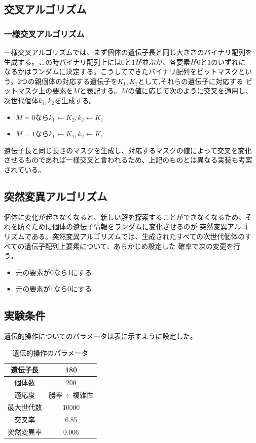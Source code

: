 \subsection{交叉アルゴリズム}
\subsubsection{一様交叉アルゴリズム}
一様交叉アルゴリズムでは、まず個体の遺伝子長と同じ大きさのバイナリ配列を生成する。この時バイナリ配列上には0と1が並ぶが、各要素が0と1のいずれに
なるかはランダムに決定する。こうしてできたバイナリ配列をビットマスクという。2つの親個体の対応する遺伝子を$K_1, K_2$として,それらの遺伝子に対応する
ビットマスク上の要素を$M$と表記する。$M$の値に応じて次のように交叉を適用し、次世代個体$k_1, k_2$を生成する。
  \begin{itemize}
    \item $M = 0$なら$k_1 \leftarrow K_2, k_2 \leftarrow \overline{K_1}$
    \item $M = 1$なら$k_1 \leftarrow K_1, k_2 \leftarrow K_1$
  \end{itemize}
遺伝子長と同じ長さのマスクを生成し、対応するマスクの値によって交叉を変化させるものであれば一様交叉と言われるため、上記のものとは異なる実装も考案されている。

\subsection{突然変異アルゴリズム}
個体に変化が起きなくなると、新しい解を探索することができなくなるため、それを防ぐために個体の遺伝子情報をランダムに変化させるのが
突然変異アルゴリズムである。突然変異アルゴリズムでは、生成されたすべての次世代個体のすべての遺伝子配列上要素について、あらかじめ設定した
確率で次の変更を行う。
  \begin{itemize}
    \item 元の要素が0なら1にする
    \item 元の要素が1なら0にする
  \end{itemize}

\subsection{実験条件}
遺伝的操作についてのパラメータは表に示すように設定した。

  \begin{table}[htb]
    \centering
    \label{geneticparameter}
    \caption{遺伝的操作のパラメータ}
    \begin{tabular}{|c|c|} \hline
      遺伝子長 & 180 \\ \hline
      個体数 & 200 \\ \hline
      適応度 & 勝率 $\div$ 複雑性 \\ \hline
      最大世代数 & 10000 \\ \hline
      交叉率 & 0.85 \\ \hline
      突然変異率 & 0.006 \\ \hline
    \end{tabular}
  \end{table}

